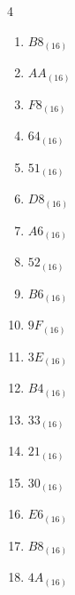 \begin{multicols}{4}
\begin{enumerate}
        \phantom{$=227$}

  \item $B8_{(16)}$

        \phantom{$=184$}

  \item $AA_{(16)}$

        \phantom{$=170$}

  \item $F8_{(16)}$

        \phantom{$=248$}

\columnbreak %

  \item $64_{(16)}$

        \phantom{$=100$}

  \item $51_{(16)}$

        \phantom{$=81$}

  \item $D8_{(16)}$

        \phantom{$=216$}

  \item $A6_{(16)}$

        \phantom{$=166$}

  \item $52_{(16)}$

        \phantom{$=82$}

  \item $B6_{(16)}$

        \phantom{$=182$}

  \item $9F_{(16)}$

        \phantom{$=159$}

  \item $3E_{(16)}$

        \phantom{$=62$}

  \item $B4_{(16)}$

        \phantom{$=180$}

  \item $33_{(16)}$

        \phantom{$=51$}

  \item $21_{(16)}$

        \phantom{$=33$}

  \item $30_{(16)}$

        \phantom{$=48$}

  \item $E6_{(16)}$

        \phantom{$=230$}

  \item $B8_{(16)}$

        \phantom{$=184$}

  \item $4A_{(16)}$

        \phantom{$=74$}

\end{enumerate}
\end{multicols}

